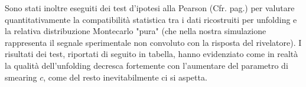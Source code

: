 \begin{figure}
	\label{fig:Unfolded}
\end{figure}

\newpage

\noindent Sono stati inoltre eseguiti dei test d'ipotesi alla Pearson (Cfr. pag.\pageref{PearsonTest}) per valutare quantitativamente la compatibilità statistica tra i dati ricostruiti per unfolding e la relativa distribuzione Montecarlo "pura" (che nella nostra simulazione rappresenta il segnale sperimentale non convoluto con la risposta del rivelatore). I risultati dei test, riportati di seguito in tabella, hanno evidenziato come in realtà la qualità dell'unfolding decresca fortemente con l'aumentare del parametro di smearing $c$, come del resto inevitabilmente ci si aspetta.

